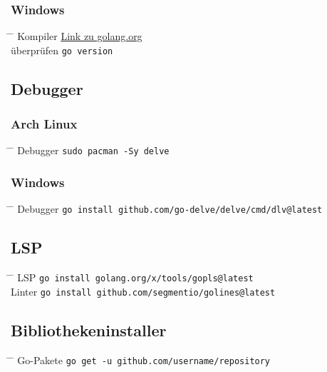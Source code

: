 \documentclass[twoside,a4paper,12pt]{article}
\begin{document}
\subsubsection{Windows}
\begin{tabbing}
  \hspace{2mm} \= \hspace{30mm} \= \kill
  \> Kompiler \> \href{https://go.dev/doc/install}{Link zu golang.org} \\
  \> überprüfen \> \verb|go version| \\
\end{tabbing}
\subsection{Debugger}
\subsubsection{Arch Linux}
\begin{tabbing}
  \hspace{2mm} \= \hspace{30mm} \= \kill
  \> Debugger \> \verb|sudo pacman -Sy delve| \\
\end{tabbing}
\subsubsection{Windows}
\begin{tabbing}
  \hspace{2mm} \= \hspace{30mm} \= \kill
  \> Debugger \> \verb|go install github.com/go-delve/delve/cmd/dlv@latest| \\
\end{tabbing}
\subsection{LSP}
\begin{tabbing}
  \hspace{2mm} \= \hspace{30mm} \= \kill
  \> LSP \>  \verb|go install golang.org/x/tools/gopls@latest| \\
  \> Linter \> \verb|go install github.com/segmentio/golines@latest| \\
\end{tabbing}
\subsection{Bibliothekeninstaller}
\begin{tabbing}
  \hspace{2mm} \= \hspace{30mm} \= \kill
  \> Go-Pakete \> \verb|go get -u github.com/username/repository|
 \end{tabbing}
\end{document}
